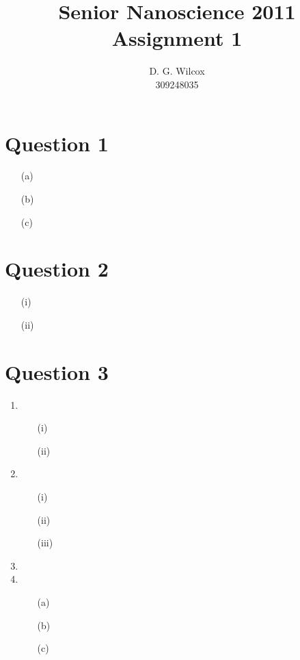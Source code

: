 \documentclass[10pt,a4paper]{article}
\title{Senior Nanoscience 2011 Assignment 1}
\date{}
\author{D. G. Wilcox \\
		309248035}
\begin{document}
\maketitle

\section*{Question 1}

\begin{itemize}
	\item[(a)]
	\item[(b)]
	\item[(c)]
\end{itemize}

\section*{Question 2}

\begin{itemize}
	\item[(i)]
	\item[(ii)]
\end{itemize}

\section*{Question 3}

\begin{enumerate}
	\item 
		\begin{itemize}
			\item[(i)]
			\item[(ii)]
		\end{itemize}
	\item
		\begin{itemize}
			\item[(i)]
			\item[(ii)]
			\item[(iii)]
		\end{itemize}
	\item
	\item
		\begin{itemize}
			\item[(a)]
			\item[(b)]
			\item[(c)]
		\end{itemize}
\end{enumerate}
\end{document}
